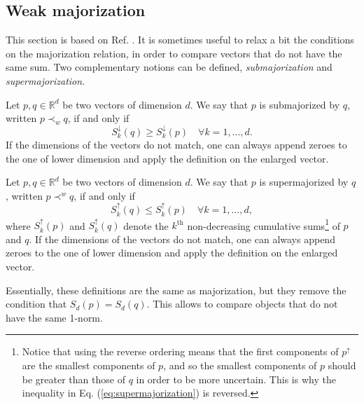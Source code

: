 \setcounter{equation}{0}

\subsection{Weak majorization}

This section is based on Ref. \cite[pp. 10--15]{marshall_inequalities_2011}. It is sometimes useful to relax a bit the conditions on the majorization relation, in order to compare vectors that do not have the same sum. Two complementary notions can be defined, \textit{submajorization} and \textit{supermajorization}.

\begin{appendix_definition}[Submajorization] \label{def:submajorization}
    Let $p, q \in \mathbb{R}^d$ be two vectors of dimension $d$. We say that $p$ is submajorized by $q$, written $p \prec_w q$, if and only if
    \begin{equation} \label{eq:submajorization}
            S^\downarrow_k (q) \geq S^\downarrow_k (p) \quad \forall k = 1,...,d.
    \end{equation}
If the dimensions of the vectors do not match, one can always append zeroes to the one of lower dimension and apply the definition on the enlarged vector.
\end{appendix_definition}

\begin{appendix_definition}[Supermajorization] \label{def:supermajorization}
    Let $p, q \in \mathbb{R}^d$ be two vectors of dimension $d$. We say that $p$ is supermajorized by $q$, written $p \prec^w q$, if and only if
    \begin{equation} \label{eq:supermajorization}
            S^\uparrow_k (q) \leq S^\uparrow_k (p) \quad \forall k = 1,...,d,
    \end{equation}
where $S^\uparrow_k(p)$ and $S^\uparrow_k (q)$ denote the $k^\text{th}$ non-decreasing cumulative sums\footnote{Notice that using the reverse ordering means that the first components of $p^\uparrow$ are the smallest components of $p$, and so the smallest components of $p$ should be greater than those of $q$ in order to be more uncertain. This is why the inequality in Eq. (\ref{eq:supermajorization}) is reversed.} of $p$ and $q$. If the dimensions of the vectors do not match, one can always append zeroes to the one of lower dimension and apply the definition on the enlarged vector.
\end{appendix_definition}

Essentially, these definitions are the same as majorization, but they remove the condition that $S_d(p) = S_d(q)$. This allows to compare objects that do not have the same 1-norm.



